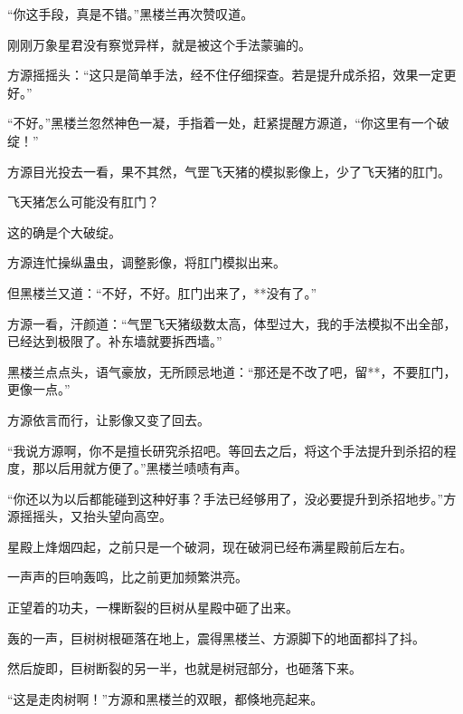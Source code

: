 \begin{this_body}
“你这手段，真是不错。”黑楼兰再次赞叹道。

刚刚万象星君没有察觉异样，就是被这个手法蒙骗的。

方源摇摇头：“这只是简单手法，经不住仔细探查。若是提升成杀招，效果一定更好。”

“不好。”黑楼兰忽然神色一凝，手指着一处，赶紧提醒方源道，“你这里有一个破绽！”

方源目光投去一看，果不其然，气罡飞天猪的模拟影像上，少了飞天猪的肛门。

飞天猪怎么可能没有肛门？

这的确是个大破绽。

方源连忙操纵蛊虫，调整影像，将肛门模拟出来。

但黑楼兰又道：“不好，不好。肛门出来了，**没有了。”

方源一看，汗颜道：“气罡飞天猪级数太高，体型过大，我的手法模拟不出全部，已经达到极限了。补东墙就要拆西墙。”

黑楼兰点点头，语气豪放，无所顾忌地道：“那还是不改了吧，留**，不要肛门，更像一点。”

方源依言而行，让影像又变了回去。

“我说方源啊，你不是擅长研究杀招吧。等回去之后，将这个手法提升到杀招的程度，那以后用就方便了。”黑楼兰啧啧有声。

“你还以为以后都能碰到这种好事？手法已经够用了，没必要提升到杀招地步。”方源摇摇头，又抬头望向高空。

星殿上烽烟四起，之前只是一个破洞，现在破洞已经布满星殿前后左右。

一声声的巨响轰鸣，比之前更加频繁洪亮。

正望着的功夫，一棵断裂的巨树从星殿中砸了出来。

轰的一声，巨树树根砸落在地上，震得黑楼兰、方源脚下的地面都抖了抖。

然后旋即，巨树断裂的另一半，也就是树冠部分，也砸落下来。

“这是走肉树啊！”方源和黑楼兰的双眼，都倏地亮起来。

\end{this_body}

